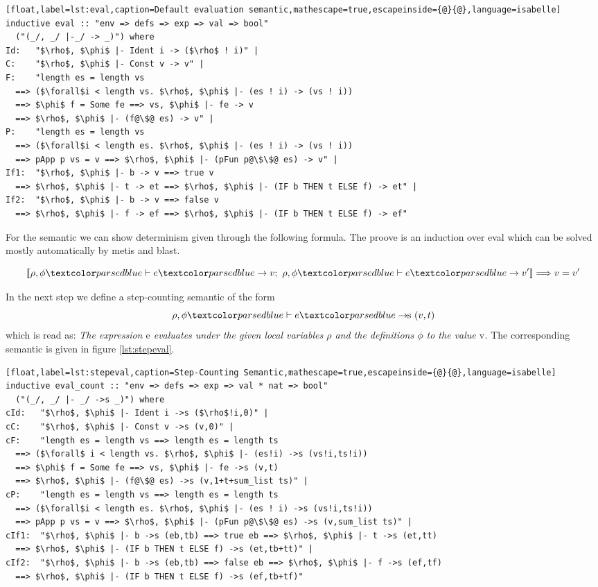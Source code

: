 \begin{lstlisting}[float,label=lst:eval,caption=Default evaluation semantic,mathescape=true,escapeinside={@}{@},language=isabelle]
inductive eval :: "env => defs => exp => val => bool"
  ("(_/, _/ |-_/ -> _)") where
Id:   "$\rho$, $\phi$ |- Ident i -> ($\rho$ ! i)" |
C:    "$\rho$, $\phi$ |- Const v -> v" |
F:    "length es = length vs
  ==> ($\forall$i < length vs. $\rho$, $\phi$ |- (es ! i) -> (vs ! i))
  ==> $\phi$ f = Some fe ==> vs, $\phi$ |- fe -> v
  ==> $\rho$, $\phi$ |- (f@\$@ es) -> v" |
P:    "length es = length vs
  ==> ($\forall$i < length es. $\rho$, $\phi$ |- (es ! i) -> (vs ! i))
  ==> pApp p vs = v ==> $\rho$, $\phi$ |- (pFun p@\$\$@ es) -> v" |
If1:  "$\rho$, $\phi$ |- b -> v ==> true v
  ==> $\rho$, $\phi$ |- t -> et ==> $\rho$, $\phi$ |- (IF b THEN t ELSE f) -> et" |
If2:  "$\rho$, $\phi$ |- b -> v ==> false v
  ==> $\rho$, $\phi$ |- f -> ef ==> $\rho$, $\phi$ |- (IF b THEN t ELSE f) -> ef"
\end{lstlisting}

For the semantic we can show determinism given through the following formula.
The proove is an induction over eval which can be solved mostly automatically by metis and blast.

\begin{equation*}
 \llbracket \rho, \phi \hvdash e \hrightarrow v; \text{ } \rho, \phi \hvdash e \hrightarrow v' \rrbracket \Longrightarrow v = v'
\end{equation*}

In the next step we define a step-counting semantic of the form
\begin{equation*}
  \rho, \phi \hvdash e \hrightarrows (v,t)
\end{equation*}
which is read as: \textit{The expression $\text{e}$ evaluates under the given local variables $\rho$ and the definitions $\phi$ to the value $\text{v}$.} The corresponding semantic is given in figure \ref{lst:stepeval}.


\begin{lstlisting}[float,label=lst:stepeval,caption=Step-Counting Semantic,mathescape=true,escapeinside={@}{@},language=isabelle]
inductive eval_count :: "env => defs => exp => val * nat => bool"
  ("(_/, _/ |- _/ ->s _)") where
cId:   "$\rho$, $\phi$ |- Ident i ->s ($\rho$!i,0)" |
cC:    "$\rho$, $\phi$ |- Const v ->s (v,0)" |
cF:    "length es = length vs ==> length es = length ts
  ==> ($\forall$ i < length vs. $\rho$, $\phi$ |- (es!i) ->s (vs!i,ts!i))
  ==> $\phi$ f = Some fe ==> vs, $\phi$ |- fe ->s (v,t)
  ==> $\rho$, $\phi$ |- (f@\$@ es) ->s (v,1+t+sum_list ts)" |
cP:    "length es = length vs ==> length es = length ts
  ==> ($\forall$i < length es. $\rho$, $\phi$ |- (es ! i) ->s (vs!i,ts!i))
  ==> pApp p vs = v ==> $\rho$, $\phi$ |- (pFun p@\$\$@ es) ->s (v,sum_list ts)" |
cIf1:  "$\rho$, $\phi$ |- b ->s (eb,tb) ==> true eb ==> $\rho$, $\phi$ |- t ->s (et,tt)
  ==> $\rho$, $\phi$ |- (IF b THEN t ELSE f) ->s (et,tb+tt)" |
cIf2:  "$\rho$, $\phi$ |- b ->s (eb,tb) ==> false eb ==> $\rho$, $\phi$ |- f ->s (ef,tf)
  ==> $\rho$, $\phi$ |- (IF b THEN t ELSE f) ->s (ef,tb+tf)"
\end{lstlisting}

